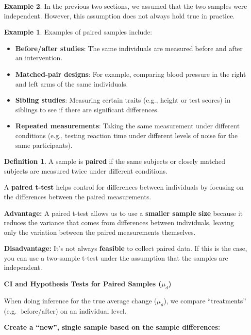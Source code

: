 \documentclass[
  11pt,
  oneside]{book}
\theoremstyle{definition}
\newtheorem{definition}{Definition}[chapter]
\theoremstyle{definition}
\newtheorem{example}{Example}[chapter]
\theoremstyle{definition}
\theoremstyle{definition}
\theoremstyle{remark}
\begin{document}
\begin{example}
In the previous two sections, we assumed that the two samples were independent. However, this assumption does not always hold true in practice.

\begin{example}

Examples of paired samples include:

\begin{itemize}
\item
  \textbf{Before/after studies}: The same individuals are measured before and after an intervention.
\item
  \textbf{Matched-pair designs}: For example, comparing blood pressure in the right and left arms of the same individuals.
\item
  \textbf{Sibling studies}: Measuring certain traits (e.g., height or test scores) in siblings to see if there are significant differences.
\item
  \textbf{Repeated measurements}: Taking the same measurement under different conditions (e.g., testing reaction time under different levels of noise for the same participants).
\end{itemize}

\end{example}

\begin{definition}
A sample is \textbf{paired} if the same subjects or closely matched subjects are measured twice under different conditions.
\end{definition}

A \textbf{paired t-test} helps control for differences between individuals by focusing on the differences between the paired measurements.

\textbf{Advantage:} A paired t-test allows us to use a \textbf{smaller sample size} because it reduces the variance that comes from differences between individuals, leaving only the variation between the paired measurements themselves.

\textbf{Disadvantage:} It's not always \textbf{feasible} to collect paired data. If this is the case, you can use a two-sample t-test under the assumption that the samples are independent.

\textbf{CI and Hypothesis Tests for Paired Samples (\(\mu_d\))}

When doing inference for the true average change (\(\mu_d\)), we compare ``treatments'' (e.g.~before/after) on an individual level.

\textbf{Create a ``new'', single sample based on the sample differences:}


\end{example}
\end{document}
